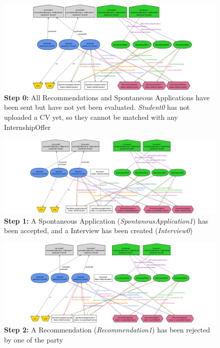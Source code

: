 \begin{figure}[H]
    \hspace{-2.5cm}
    \includegraphics[width=1.3\linewidth]{Latex/Images/Alloy/0.png}
    \caption*{\textbf{Step 0:} All Recommendations and Spontaneous Applications have been sent but have not yet been evaluated. \textit{Student0} has not uploaded a CV yet, so they cannot be matched with any InternshipOffer}
    \label{fig:ALIMG0}
\end{figure}
\begin{figure}[H]
    \hspace{-2.5cm}
    \includegraphics[width=1.3\linewidth]{Latex/Images/Alloy/1.png}
    \caption*{\textbf{Step 1:} A Spontaneous Application (\textit{SpontanousApplication1}) has been accepted, and a Interview has been created (\textit{Interview0})}
    \label{fig:ALIMG1}
\end{figure}
\begin{figure}[H]
    \hspace{-2.5cm}
    \includegraphics[width=1.3\linewidth]{Latex/Images/Alloy/2.png}
    \caption*{\textbf{Step 2:} A Recommendation (\textit{Recommendation1}) has been rejected by one of the party}
    \label{fig:ALIMG2}
\end{figure}
